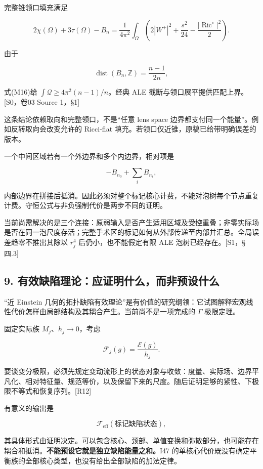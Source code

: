 \documentclass[UTF8,a4paper,11pt,fontset=fandol]{ctexart}
\begin{document}
完整锥领口填充满足

\[
2\chi(\Omega)+3\tau(\Omega)-B_n
=\frac1{4\pi^2}\int_\Omega
\left(2|W^+|^2+\frac{s^2}{24}-\frac{|\operatorname{Ric}^{\circ}|^2}{2}\right).
\tag{M16}
\]

由于

\[
\operatorname{dist}(B_n,\mathbb Z)=\frac{n-1}{2n},
\]

式(M16)给 \(\int\mathscr Q\ge4\pi^2(n-1)/n\)。经典 ALE
截断与领口展平提供匹配上界。{[}S0，卷03 Source 1，§1{]}

这条结论依赖取向和完整领口，不是``任意 lens space
边界都支付同一个能量''。例如反转取向会改变允许的 Ricci-flat
填充。若领口仅近锥，原稿已给带明确误差的版本。

一个中间区域若有一个外边界和多个内边界，相对项是

\[
-B_{n_0}+\sum_iB_{n_i},
\]

内部边界在拼接后抵消。因此必须对整个标记核心计费，不能对泡树每个节点重复计费。守恒公式与非负强制代价是两步不同的证明。

当前尚需解决的是三个连接：原弱输入是否产生适用区域及受控重叠；非零实际场是否在同一泡尺度存活；完整手术区的标记如何从外部传递至内部并汇总。全局误差趋零不推出其除以
\(r_j^4\) 后仍小，也不能假定有限 ALE 泡树已经存在。{[}S1，§四.3{]}

\subsection{9.
有效缺陷理论：应证明什么，而非预设什么}\label{ux6709ux6548ux7f3aux9677ux7406ux8bbaux5e94ux8bc1ux660eux4ec0ux4e48ux800cux975eux9884ux8bbeux4ec0ux4e48}

``近 Einstein
几何的拓扑缺陷有效理论''是有价值的研究纲领：它试图解释宏观线性代价怎样由局部结构及其耦合产生。当前尚不是一项完成的
\(\Gamma\) 极限定理。

固定实际族 \(M_j\)、\(h_j\to0\)，考虑

\[
\mathcal F_j(g)=\frac{\mathcal E(g)}{h_j}.
\]

要谈变分极限，必须先规定变动流形上的状态对象与收敛：度量、实际场、边界平凡化、相对特征量、规范等价，以及保留下来的尺度。随后证明足够的紧性、下极限不等式和恢复序列。{[}R12{]}

有意义的输出是

\[
\mathcal F_{\mathrm{eff}}(\text{标记缺陷状态}),
\]

其具体形式由证明决定。可以包含核心、颈部、单值变换和弥散部分，也可能存在耦合和抵消。\textbf{不能预设它就是独立缺陷能量之和。}I47
的单核心代价既没有确定平衡族的全部核心类型，也没有给出全部缺陷的加法定律。
\end{document}
